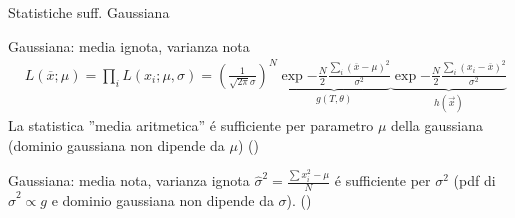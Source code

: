 \documentclass[asd-beamer.tex]{subfiles}
\begin{document}
\begin{frame}{Statistiche suff. Gaussiana}
\begin{block}{Gaussiana: media ignota, varianza nota}
	\begin{align*}
	&L(\overline{x};\mu)=\prod_iL(x_i;\mu,\sigma)=(\frac{1}{\sqrt{2\pi}\sigma})^N\underbrace{\exp{-\frac{N}{2}\frac{\sum_i(\overline{x}-\mu)^2}{\sigma^2}}}_{g(T,\theta)}\underbrace{\exp{-\frac{N}{2}\frac{\sum_i(x_i-\overline{x})^2}{\sigma^2}}}_{h(\vec{x})}
	\end{align*}
	La statistica ''media aritmetica'' \'e sufficiente per parametro $\mu$ della gaussiana (dominio gaussiana non dipende da $\mu$) ()
\end{block}
\begin{block}{Gaussiana: media nota, varianza ignota}
	$\hat{\sigma}^2=\frac{\sum x_i^2-\mu}{N}$ \'e sufficiente per $\sigma^2$ (pdf di $\hat{\sigma}^2\propto g$ e dominio gaussiana non dipende da $\sigma$). ()
\end{block}
\end{frame}
\end{document}
